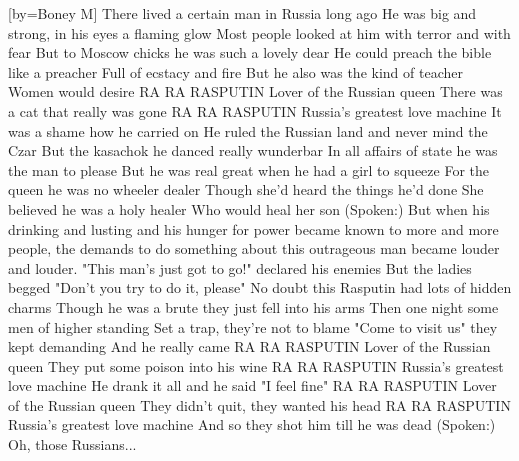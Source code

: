 [by={Boney M}]
\beginverse\singlespacing
There lived a certain man in Russia long ago
He was big and strong, in his eyes a flaming glow
Most people looked at him with terror and with fear
But to Moscow chicks he was such a lovely dear
He could preach the bible like a preacher
Full of ecstacy and fire
But he also was the kind of teacher
Women would desire
\endverse
\beginchorus\singlespacing
  RA RA RASPUTIN
  Lover of the Russian queen
  There was a cat that really was gone
  RA RA RASPUTIN
  Russia's greatest love machine
  It was a shame how he carried on
\endchorus
\beginverse\singlespacing
He ruled the Russian land and never mind the Czar
But the kasachok he danced really wunderbar
In all affairs of state he was the man to please
But he was real great when he had a girl to squeeze
For the queen he was no wheeler dealer
Though she'd heard the things he'd done
She believed he was a holy healer
Who would heal her son
\endverse
{}
\beginverse\singlespacing
(Spoken:)
But when his drinking and lusting and his hunger
for power became known to more and more people,
the demands to do something about this outrageous
man became louder and louder.
\endverse
\beginverse\singlespacing
"This man's just got to go!" declared his enemies
But the ladies begged "Don't you try to do it, please"
No doubt this Rasputin had lots of hidden charms
Though he was a brute they just fell into his arms
Then one night some men of higher standing
Set a trap, they're not to blame
"Come to visit us" they kept demanding
And he really came
\endverse
\beginchorus\singlespacing
RA RA RASPUTIN
Lover of the Russian queen
They put some poison into his wine
RA RA RASPUTIN
Russia's greatest love machine
He drank it all and he said "I feel fine"
\endchorus
\beginchorus\singlespacing
RA RA RASPUTIN
Lover of the Russian queen
They didn't quit, they wanted his head
RA RA RASPUTIN
Russia's greatest love machine
And so they shot him till he was dead
\endchorus
\beginverse*\singlespacing
(Spoken:) Oh, those Russians... 
\endverse
\endsong
